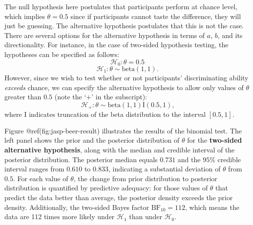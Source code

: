 \documentclass[
  letterpaper,
  DIV=11,
  numbers=noendperiod]{scrreprt}
\begin{document}
The null hypothesis here postulates that participants perform at chance
level, which implies \(\theta = 0.5\) since if participants cannot taste
the difference, they will just be guessing. The alternative hypothesis
postulates that this is not the case. There are several options for the
alternative hypothesis in terms of \(a\), \(b\), and its directionality.
For instance, in the case of two-sided hypothesis testing, the
hypotheses can be specified as follows: \begin{equation*}
\mathcal{H}_0:  \theta = 0.5
\end{equation*} \begin{equation}
\mathcal{H}_1:  \theta \sim \text{beta}(1, 1)\text{.}
\label{eq:hypoSetupTwoSided}
\end{equation} However, since we wish to test whether or not
participants' discriminating ability \emph{exceeds} chance, we can
specify the alternative hypothesis to allow only values of \(\theta\)
greater than \(0.5\) (note the `\(+\)' in the subscript):
\begin{equation}
\mathcal{H}_+:  \theta \sim \text{beta}(1, 1) \text{I}  (0.5, 1)\text{,}
\label{eq:hypoSetup}
\end{equation} where I indicates truncation of the beta distribution to
the interval \([0.5, 1]\).

Figure @ref(fig:jasp-beer-result) illustrates the results of the
binomial test. The left panel shows the prior and the posterior
distribution of \(\theta\) for the \textbf{two-sided alternative
hypothesis}, along with the median and credible interval of the
posterior distribution. The posterior median equals \(0.731\) and the
\(95\%\) credible interval ranges from \(0.610\) to \(0.833\),
indicating a substantial deviation of \(\theta\) from \(0.5\). For each
value of \(\theta\), the change from prior distribution to posterior
distribution is quantified by predictive adequacy: for those values of
\(\theta\) that predict the data better than average, the posterior
density exceeds the prior density. Additionally, the two-sided Bayes
factor \(\text{BF}_{10} = 112\), which means the data are 112 times more
likely under \(\mathcal{H}_1\) than under \(\mathcal{H}_0\).
\end{document}
